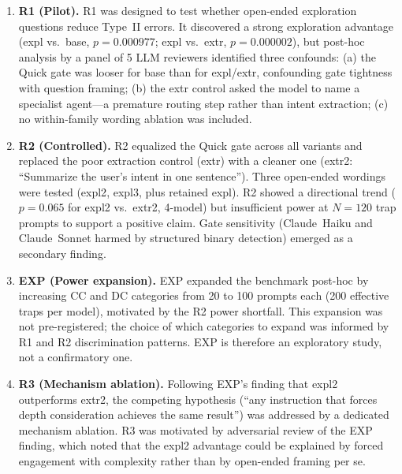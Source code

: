 \documentclass[11pt,a4paper]{article}
\begin{document}
\begin{enumerate}[itemsep=2pt]

  \item \textbf{R1 (Pilot).}  R1 was designed to test whether open-ended
    exploration questions reduce Type~II errors.  It discovered a strong
    exploration advantage (expl vs.\ base, $p = 0.000977$; expl vs.\ extr,
    $p = 0.000002$), but post-hoc analysis by a panel of 5 LLM reviewers
    identified three confounds: (a) the Quick gate was looser for
    \textsf{base} than for \textsf{expl}/\textsf{extr}, confounding gate
    tightness with question framing; (b) the \textsf{extr} control asked the
    model to name a specialist agent---a premature routing step rather than
    intent extraction; (c) no within-family wording ablation was included.

  \item \textbf{R2 (Controlled).}  R2 equalized the Quick gate across all
    variants and replaced the poor extraction control (\textsf{extr}) with a
    cleaner one (\textsf{extr2}: ``Summarize the user's intent in one
    sentence'').  Three open-ended wordings were tested (\textsf{expl2},
    \textsf{expl3}, plus retained \textsf{expl}).  R2 showed a directional
    trend ($p = 0.065$ for \textsf{expl2} vs.\ \textsf{extr2}, 4-model) but
    insufficient power at $N = 120$ trap prompts to support a positive claim.
    Gate sensitivity (Claude~Haiku and Claude~Sonnet harmed by structured
    binary detection) emerged as a secondary finding.

  \item \textbf{EXP (Power expansion).}  EXP expanded the benchmark
    post-hoc by increasing CC and DC categories from 20 to 100 prompts each
    (200 effective traps per model), motivated by the R2 power shortfall.
    This expansion was not pre-registered; the choice of which categories to
    expand was informed by R1 and R2 discrimination patterns.  EXP is
    therefore an exploratory study, not a confirmatory one.

  \item \textbf{R3 (Mechanism ablation).}  Following EXP's finding that
    \textsf{expl2} outperforms \textsf{extr2}, the competing hypothesis
    (``any instruction that forces depth consideration achieves the same
    result'') was addressed by a dedicated mechanism ablation.  R3 was
    motivated by adversarial review of the EXP finding, which noted that the
    expl2 advantage could be explained by forced engagement with complexity
    rather than by open-ended framing per se.

\end{enumerate}
\end{document}
